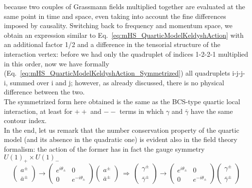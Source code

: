 \documentclass[a4paper,11pt, english]{article}
\theoremstyle{remark}
\newcommand{\nline}{\\[0.3cm]}
\begin{document}
because two couples of Grassmann fields multiplied together are evaluated at the same point in time and space, even taking into account the fine differences imposed by causality. Switching back to frequency and momentum space, we obtain an expression similar to Eq.~\eqref{eq:mHS_QuarticModelKeldyshAction} with an additional factor 1/2 and a difference in the tensorial structure of the interaction vertex: before we had only the quadruplet of indices 1-2-2-1 multiplied in this order, now we have formally (Eq.~\eqref{eq:mHS_QuarticModelKeldyshAction_Symmetrized}) all quadruplets i-j-j-i, summed over i and j; however, as already discussed, there is no physical difference between the two.\\ The symmetrized form here obtained is the same as the BCS-type quartic local interaction, at least for $++$ and $--$ terms in which $\gamma$ and $\bar{\gamma}$ have the same contour index.\nline
In the end, let us remark 
that the number conservation property of the quartic model (and its absence in the quadratic one) is evident also in the field theory formalism: the action of the former has in fact the gauge symmetry $U(1)_+\times U(1)_-$
\begin{equation}
 \begin{pmatrix} a^{\pm} \\ \bar{a}^{\pm} \end{pmatrix} \to \begin{pmatrix} e^{i\theta_{\pm}} & 0 \\ 0 & e^{-i\theta_{\pm}} \end{pmatrix} \begin{pmatrix} a^{\pm} \\ \bar{a}^{\pm} \end{pmatrix} 
 \ \Rightarrow\ 
 \begin{pmatrix} \gamma^{\pm} \\ \bar{\gamma}^{\pm} \end{pmatrix} \to \begin{pmatrix} e^{i\theta_{\pm}} & 0 \\ 0 & e^{-i\theta_{\pm}} \end{pmatrix} \begin{pmatrix} \gamma^{\pm} \\ \bar{\gamma}^{\pm} \end{pmatrix} \label{eq:mHS_U(1)Transform_KeldyshPM}
 \end{equation}
\end{document}
